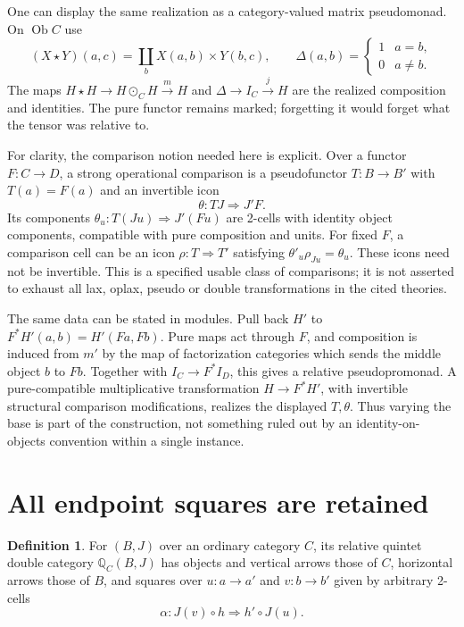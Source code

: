 \documentclass[11pt]{article}
\theoremstyle{definition}
\newtheorem{definition}[theorem]{Definition}
\newcommand{\Ob}{\operatorname{Ob}}
\newcommand{\Qrel}{\mathbb Q}
\begin{document}
One can display the same realization as a category-valued matrix
pseudomonad. On $\Ob C$ use
\[
 (X\star Y)(a,c)=\coprod_bX(a,b)\times Y(b,c),\qquad
 \Delta(a,b)=\begin{cases}1&a=b,\\0&a\ne b.\end{cases}
\]
The maps $H\star H\to H\odot_C H\xrightarrow{m}H$ and
$\Delta\to I_C\xrightarrow{j}H$ are the realized composition and identities.
The pure functor remains marked; forgetting it would forget what the tensor
was relative to.

For clarity, the comparison notion needed here is explicit. Over a functor
$F:C\to D$, a strong operational comparison is a pseudofunctor
$T:B\to B'$ with $T(a)=F(a)$ and an invertible icon
\[
 \theta:TJ\Longrightarrow J'F.
\]
Its components $\theta_u:T(Ju)\Rightarrow J'(Fu)$ are 2-cells with identity
object components, compatible with pure composition and units. For fixed
$F$, a comparison cell can be an icon $\rho:T\Rightarrow T'$ satisfying
$\theta'_u\rho_{Ju}=\theta_u$. These icons need not be invertible. This is a
specified usable class of comparisons; it is not asserted to exhaust all
lax, oplax, pseudo or double transformations in the cited theories.

The same data can be stated in modules. Pull back $H'$ to
$F^*H'(a,b)=H'(Fa,Fb)$. Pure maps act through $F$, and composition is induced
from $m'$ by the map of factorization categories which sends the middle
object $b$ to $Fb$. Together with $I_C\to F^*I_D$, this gives a relative
pseudopromonad. A pure-compatible multiplicative transformation
$H\to F^*H'$, with invertible structural comparison modifications, realizes
the displayed $T,\theta$. Thus varying the base is part of the construction,
not something ruled out by an identity-on-objects convention within a single
instance.

\section{All endpoint squares are retained}\label{sec:squares}

\begin{definition}
For $(B,J)$ over an ordinary category $C$, its relative quintet double
category $\Qrel_C(B,J)$ has objects and vertical arrows those of $C$,
horizontal arrows those of $B$, and squares over $u:a\to a'$ and $v:b\to b'$
given by arbitrary 2-cells
\begin{equation}\label{eq:square}
 \alpha:J(v)\circ h\Longrightarrow h'\circ J(u).
\end{equation}
\end{definition}
\end{document}
